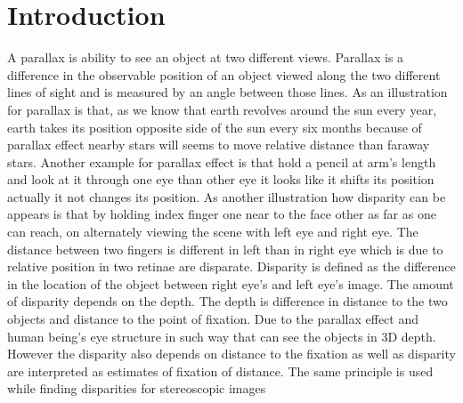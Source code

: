 \chapter{Introduction}
\label{ChapterIntroduction}
A parallax is ability to see an object at two different views. Parallax is a difference in the observable position of an object viewed along the two different lines of sight and is measured by an angle between those lines.\newline
As an illustration for parallax is that, as we know that earth revolves around the sun every year, earth takes its position opposite side of the sun every six months because of parallax effect nearby stars will seems to move relative distance than faraway stars. Another example for parallax effect is that hold a pencil at arm's length and look at it through one eye than other eye it looks like it shifts its position actually it not changes its position.\newline
 As another illustration how disparity can be appears is that by holding index finger one near to the face other as far as one can reach, on alternately viewing the scene with left eye and right eye. The distance between two fingers is different in left than in right eye which is due to relative position in two retinae are disparate.\newline
Disparity is defined as the difference in the location of the object between right eye's and left eye's image. The amount of disparity depends on the depth.
The depth is difference in distance to the two objects and distance to the point of fixation. Due to the parallax effect and human being's eye structure in such way that can see the objects in 3D depth. However the disparity also depends on distance to the fixation as well as disparity are interpreted as estimates of fixation of distance. The same principle is used while finding disparities for stereoscopic images\newline
